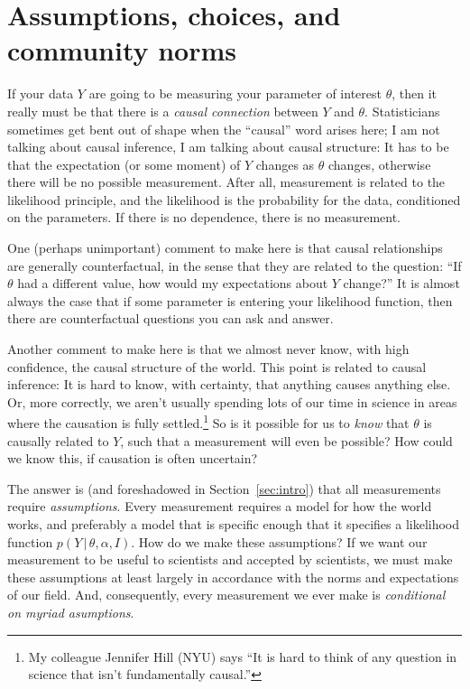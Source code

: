 \documentclass{article}
\newcommand{\sectionname}{Section}
\newcommand{\secref}[1]{\sectionname~\ref{#1}}
\newcommand{\given}{\,|\,}
\begin{document}
\section{Assumptions, choices, and community norms}\label{sec:assumptions}
If your data $Y$ are going to be measuring your parameter of interest $\theta$, then it really must be that there is a \emph{causal connection} between $Y$ and $\theta$.
Statisticians sometimes get bent out of shape when the ``causal'' word arises here; I am not talking about causal inference, I am talking about causal structure:
It has to be that the expectation (or some moment) of $Y$ changes as $\theta$ changes, otherwise there will be no possible measurement.
After all, measurement is related to the likelihood principle, and the likelihood is the probability for the data, conditioned on the parameters.
If there is no dependence, there is no measurement.

One (perhaps unimportant) comment to make here is that causal relationships are generally counterfactual, in the sense that they are related to the question:
``If $\theta$ had a different value, how would my expectations about $Y$ change?''
It is almost always the case that if some parameter is entering your likelihood function, then there are counterfactual questions you can ask and answer.

Another comment to make here is that we almost never know, with high confidence, the causal structure of the world.
This point is related to causal inference:
It is hard to know, with certainty, that anything causes anything else.
Or, more correctly, we aren't usually spending lots of our time in science in areas where the causation is fully settled.\footnote{My colleague Jennifer Hill (NYU) says ``It is hard to think of any question in science that isn't fundamentally causal.''}
So is it possible for us to \emph{know} that $\theta$ is causally related to $Y$, such that a measurement will even be possible?
How could we know this, if causation is often uncertain?

The answer is (and foreshadowed in \secref{sec:intro}) that all measurements require \emph{assumptions}.
Every measurement requires a model for how the world works, and preferably a model that is specific enough that it specifies a likelihood function $p(Y\given\theta,\alpha,I)$.
How do we make these assumptions?
If we want our measurement to be useful to scientists and accepted by scientists, we must make these assumptions at least largely in accordance with the norms and expectations of our field.
And, consequently, every measurement we ever make is \emph{conditional on myriad asumptions}.
\end{document}
